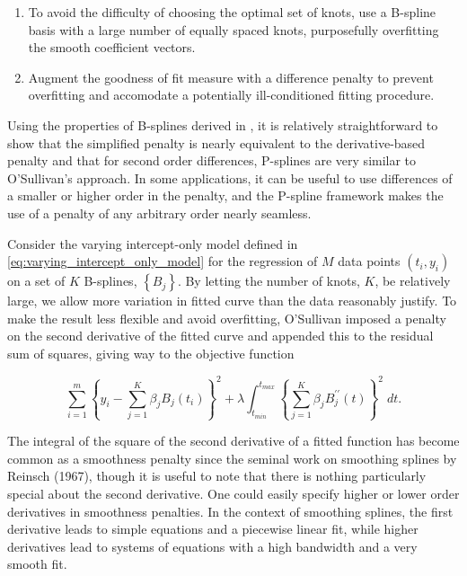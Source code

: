 \documentclass[12pt]{article}
\newcommand*\needsparaphrased{\color{red}}
\begin{document}
\begin{enumerate}
\item To avoid the difficulty of choosing the optimal set of knots, use a B-spline basis with a large number of equally spaced knots, purposefully overfitting the smooth coefficient vectors. 
\item Augment the goodness of fit measure with a difference penalty to prevent overfitting and accomodate a potentially ill-conditioned fitting procedure.
\end{enumerate}  
 
Using the properties of B-splines derived in {\needsparaphrased{B-spline section}}, it is relatively straightforward to show that the simplified penalty is nearly equivalent to the derivative-based penalty and that for second order differences, P-splines are very similar to O'Sullivan's approach. In some applications, it can be useful to use differences of a smaller or higher order in the penalty, and the P-spline framework makes the use of a penalty of any arbitrary order nearly seamless. 
 
Consider the varying intercept-only model defined in \ref{eq:varying_intercept_only_model} for the regression of $M$ data points $\left(t_i,y_i\right)$ on a set of $K$ B-splines, $\left\{B_j\right\}$.  By letting the number of knots, $K$, be relatively large, we allow more variation in fitted curve than the data reasonably justify. To make the result less flexible and avoid overfitting, O'Sullivan imposed a penalty on the second derivative of the fitted curve and appended this to the residual sum of squares, giving way to the objective function

\begin{equation} \label{eq:univariate_bspline_ridge_penalty}
\sum_{i=1}^m \left \{ y_i - \sum_{j=1}^K \beta_j B_j\left(t_i\right) \right \}^2 + \lambda \int_{t_{min}}^{t_{max}} \left\{  \sum_{j=1}^K \beta_j B^{\prime \prime}_j\left(t\right) \right\}^2 \; dt.
\end{equation}

The integral of the square of the second derivative of a fitted function has become common as a smoothness penalty since the seminal work on smoothing splines by Reinsch (1967), though it is useful to note that there is nothing particularly special about the second derivative. One could easily specify higher or lower order derivatives in smoothness penalties. In the context of smoothing splines, the first derivative leads to simple equations and a piecewise linear fit, while higher derivatives lead to systems of equations with a high bandwidth and a very smooth fit. 
\end{document}
